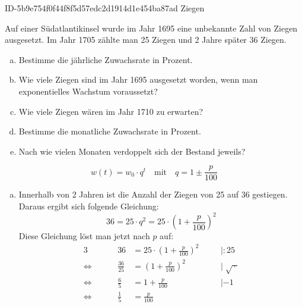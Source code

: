 \begin{exercise}
      {ID-5b9e754f0f44f8f5d57edc2d1914d1e454ba87ad}
      {Ziegen}
  \ifproblem\problem\par
    Auf einer Südatlantikinsel wurde im Jahr 1695 eine
    unbekannte Zahl von Ziegen ausgesetzt. Im Jahr 1705
    zählte man 25 Ziegen und 2 Jahre später
    36 Ziegen.
    \begin{enumerate}[a)]
      \item Bestimme die jährliche Zuwachsrate in Prozent.
      \item Wie viele Ziegen sind im Jahr 1695 ausgesetzt
            worden, wenn man exponentielles Wachstum voraussetzt?
      \item Wie viele Ziegen wären im Jahr 1710 zu erwarten?
      \item Bestimme die monatliche Zuwachsrate in Prozent.
      \item Nach wie vielen Monaten verdoppelt sich der Bestand
            jeweils?
    \end{enumerate}
  \fi
  \ifoutline\outline
    \begin{equation*}
      w(t)=w_0\cdot q^t
      \quad\text{mit}\quad
      q=1\pm\frac{p}{100}
    \end{equation*}
  \fi
  \ifoutcome\outcome
    \begin{enumerate}[a)]
      \item Innerhalb von 2 Jahren ist die Anzahl der Ziegen
            von 25 auf 36 gestiegen. Daraus ergibt sich folgende
            Gleichung:
            \begin{equation*}
              36=25\cdot q^2=25\cdot\left(1+\frac{p}{100}\right)^2
            \end{equation*}
            Diese Gleichung löst man jetzt nach $p$ auf:
            \begin{alignat*}{3}
              \quad&\quad
              &
              36&=25\cdot\left(1+\frac{p}{100}\right)^2
              &
              \quad&|:25
              \\[1ex]
              \Leftrightarrow&\quad
              &
              \frac{36}{25}&=\left(1+\frac{p}{100}\right)^2
              &
              \quad&|\;\sqrt{\,\cdot\,}
              \\[1ex]
              \Leftrightarrow&\quad
              &
              \frac{6}{5}&=1+\frac{p}{100}
              &
              \quad&|-1
              \\[1ex]
              \Leftrightarrow&\quad
              &
              \frac{1}{5}&=\frac{p}{100}

\end{alignat*}
\end{enumerate}
\end{exercise}
